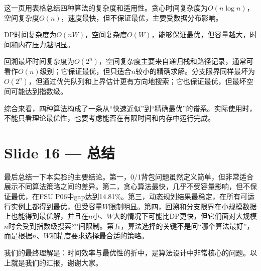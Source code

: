 \documentclass[12pt,a4paper]{ctexart}
\begin{document}
这一页用表格总结四种算法的复杂度和适用性。贪心时间复杂度为$O(n\log n)$，空间复杂度$O(n)$，速度最快，但不保证最优，主要受数据分布影响。

DP时间复杂度为$O(nW)$，空间复杂度$O(W)$，能够保证最优，但容量越大，时间和内存压力越明显。

回溯最坏时间复杂度为$O(2^n)$，空间复杂度主要来自递归栈和路径记录，通常可看作$O(n)$级别；它保证最优，但只适合$n$较小的精确求解。分支限界同样最坏为$O(2^n)$，但通过优先队列和上界估计更有方向地搜索；它也保证最优，但最坏空间可能达到指数级。

综合来看，四种算法构成了一条从“快速近似”到“精确最优”的谱系。实际使用时，不能只看理论最优性，也要考虑能否在有限时间和内存中运行完成。

\section*{Slide 16 — 总结}

最后总结一下本实验的主要结论。第一，0/1背包问题虽然定义简单，但非常适合展示不同算法策略之间的差异。第二，贪心算法最快，几乎不受容量影响，但不保证最优，在FSU P06中gap达到14.81\%。第三，动态规划结果最稳定，在所有可运行实例上都得到最优，但受容量$W$限制明显。第四，回溯和分支限界在小规模数据上也能得到最优解，并且在$n$小、$W$大的情况下可能比DP更快，但它们面对大规模$n$时会受到指数级搜索空间限制。第五，算法选择的关键不是问“哪个算法最好”，而是根据$n$、$W$和精度要求选择最合适的策略。

我们的最终理解是：时间效率与最优性的折中，是算法设计中非常核心的问题。以上就是我们的汇报，谢谢大家。
\end{document}
